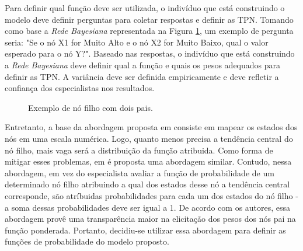 Para definir qual função deve ser utilizada, o indivíduo que está construindo o modelo deve definir perguntas para coletar respostas e definir as TPN. Tomando como base a \textit{Rede Bayesiana} representada na Figura \ref{modelo:funcoes:bn1}, um exemplo de pergunta seria: "Se o nó X1 for Muito Alto e o nó X2 for Muito Baixo, qual o valor esperado para o nó Y?". Baseado nas respostas, o indivíduo que está construindo a \textit{Rede Bayesiana} deve definir qual a função e quais os pesos adequados para definir as TPN. A variância deve ser definida empiricamente e deve refletir a confiança dos especialistas nos resultados.

\begin{figure}[ht!]
\begin{center}
	\end{center}
	\caption{Exemplo de nó filho com dois pais.}
	\label{modelo:funcoes:bn1}
\end{figure}

Entretanto, a base da abordagem proposta em \cite{fenton} consiste em mapear os estados dos nós em uma escala numérica. Logo, quanto menos precisa a tendência central do nó filho, mais vaga será a distribuição da função atribuida. Como forma de mitigar esses problemas, em \cite{laitila} é proposta uma abordagem similar. Contudo, nessa abordagem, em vez do especialista avaliar a função de probabilidade de um determinado nó filho atribuindo a qual dos estados desse nó a tendência central corresponde, são atríbuidas probabilidades para cada um dos estados do nó filho - a soma dessas probabilidades deve ser igual a 1. De acordo com os autores, essa abordagem provê uma transparência maior na elicitação dos pesos dos nós pai na função ponderada. Portanto, decidiu-se utilizar essa abordagem para definir as funções de probabilidade do modelo proposto.

